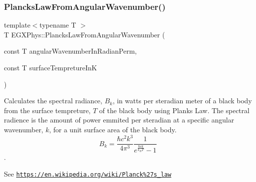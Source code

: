 \subsubsection{\texorpdfstring{Plancks\+Law\+From\+Angular\+Wavenumber()}{PlancksLawFromAngularWavenumber()}}
{\footnotesize\ttfamily template$<$typename T $>$ \\
T E\+G\+X\+Phys\+::\+Plancks\+Law\+From\+Angular\+Wavenumber (\begin{DoxyParamCaption}\item[{const T}]{angular\+Wavenumber\+In\+Radian\+Perm,  }\item[{const T}]{surface\+Tempreture\+InK }\end{DoxyParamCaption})}



Calculates the spectral radiance, $B_{k}$, in watts per steradian meter of a black body from the surface tempreture, $T$ of the black body using Plank\textquotesingle{}s Law. The spectral radience is the amount of power emmited per steradian at a specific angular wavenumber, $k$, for a unit surface area of the black body. \[ B_{k} = \dfrac{\hbar c^2 k^3}{4\pi^3} \dfrac{1}{e^{\frac{\hbar c k}{k_B T}} - 1} \]. 

See \href{https://en.wikipedia.org/wiki/Planck%27s_law}{\tt https\+://en.\+wikipedia.\+org/wiki/\+Planck\%27s\+\_\+law}


